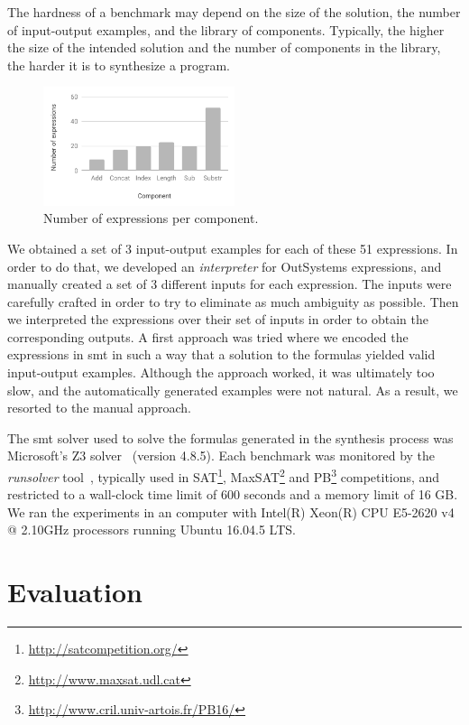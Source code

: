 The hardness of a benchmark may depend on the size of the solution, the number
of input-output examples, and the library of components.
Typically, the higher the size of the intended solution and the number of
components in the library, the harder it is to synthesize a program.

\begin{figure}
  \centering
  \includegraphics[width=0.5\textwidth]{assets/bar-chart-components-freq-51.pdf}
  \caption{Number of expressions per component.}
  \label{fig:bar-chart-components-freq-51}
\end{figure}

We obtained a set of 3 input-output examples for each of these 51 expressions.
In order to do that, we developed an \textit{interpreter} for OutSystems
expressions, and manually created a set of 3 different inputs for each
expression.
The inputs were carefully crafted in order to try to eliminate as much ambiguity
as possible.
Then we interpreted the expressions over their set of inputs in order to
obtain the corresponding outputs.
A first approach was tried where we encoded the expressions in \gls{smt} in such
a way that a solution to the formulas yielded valid input-output examples.
Although the approach worked, it was ultimately too slow, and the automatically
generated examples were not natural.
As a result, we resorted to the manual approach.

The \gls{smt} solver used to solve the formulas generated in the synthesis
process was Microsoft's Z3 solver~\cite{DeMoura:2008:ZES} (version 4.8.5).
Each benchmark was monitored by the \textit{runsolver}
tool~\cite{Roussel:2011:JSAT}, typically used in
SAT\footnote{\url{http://satcompetition.org/}},
MaxSAT\footnote{\url{http://www.maxsat.udl.cat}} and
PB\footnote{\url{http://www.cril.univ-artois.fr/PB16/}}
competitions, and restricted to a wall-clock time limit of 600 seconds and a
memory limit of 16 GB.
We ran the experiments in an computer with Intel(R) Xeon(R) CPU E5-2620 v4 @
2.10GHz processors running Ubuntu 16.04.5 LTS.

\section{Evaluation}
\label{sec:results}

